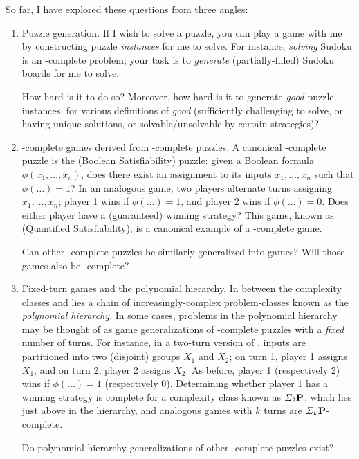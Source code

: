 So far, I have explored these questions from three angles:
\begin{enumerate}

  \item \label{itm:intro.q.generation} Puzzle generation.  If I wish to solve a
    puzzle, you can play a game with me by constructing puzzle \emph{instances}
    for me to solve.  For instance, \emph{solving} Sudoku is an \NP-complete
    problem; your task is to \emph{generate} (partially-filled) Sudoku boards
    for me to solve.

    How hard is it to do so?  Moreover, how hard is it to generate \emph{good}
    puzzle instances, for various definitions of \emph{good} (sufficiently
    challenging to solve, or having unique solutions, or solvable/unsolvable by
    certain strategies)?


  \item \label{itm:intro.q.pspace} \PSPACE-complete games derived from
    \NP-complete puzzles.  A canonical \NP-complete puzzle is the 
    (Boolean Satisfiability) puzzle: given a Boolean formula \(\phi(x_1, \dots,
    x_n)\), does there exist an assignment to its inputs \(x_1, \dots, x_n\)
    such that \(\phi(\dots) = 1\)? In an analogous game, two players alternate
    turns assigning \(x_1, \dots, x_n\); player 1 wins if \(\phi(\dots)=1\),
    and player 2 wins if \(\phi(\dots)=0\).  Does either player have a
    (guaranteed) winning strategy?  This game, known as 
    (Quantified Satisfiability), is a canonical example of a \PSPACE-complete
    game.

    Can other \NP-complete puzzles be similarly generalized into games?  Will
    those games also be \PSPACE-complete?


  \item \label{itm:intro.q.ph} Fixed-turn games and the polynomial hierarchy.
    In between the complexity classes \NP{} and \PSPACE{} lies a chain of
    increasingly-complex problem-classes known as the \emph{polynomial
    hierarchy}.  In some cases, problems in the polynomial hierarchy may be
    thought of as game generalizations of \NP-complete puzzles with a
    \emph{fixed} number of turns.  For instance, in a two-turn version of
    , inputs are partitioned into two (disjoint) groups \(X_1\)
    and \(X_2\); on turn 1, player 1 assigns \(X_1\), and on turn 2, player 2
    assigns \(X_2\).  As before, player 1 (respectively 2) wins if
    \(\phi(\dots) = 1\) (respectively \(0\)).  Determining whether player 1 has
    a winning strategy is complete for a complexity class known as
    \(\Sigma_{2}\mathbf{P}\), which lies just above \NP{} in the hierarchy, and analogous
    games with \(k\) turns are \(\Sigma_{k}\mathbf{P}\)-complete.

    Do polynomial-hierarchy generalizations of other \NP-complete puzzles
    exist?

\end{enumerate}

